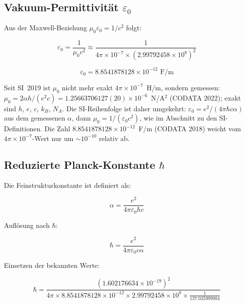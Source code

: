 	\subsection{Vakuum-Permittivität $\varepsilon_0$}
	
	Aus der Maxwell-Beziehung $\mu_0 \varepsilon_0 = 1/c^2$ folgt:
	
	\begin{equation}
		\varepsilon_0 = \frac{1}{\mu_0 c^2} \approx \frac{1}{4\pi \times 10^{-7} \times (2.99792458 \times 10^8)^2}
	\end{equation}
	
	\begin{tcolorbox}[colback=green!5!white,colframe=green!75!black,title=Vakuum-Permittivität]
		\begin{equation}
			\boxed{\varepsilon_0 = 8.8541878128 \times 10^{-12} \text{ F/m}}
		\end{equation}
	\end{tcolorbox}
	
	Seit SI~2019 ist $\mu_0$ nicht mehr exakt $4\pi\times10^{-7}$~H/m, sondern gemessen: $\mu_0 = 2\alpha h/(e^2 c) = 1.25663706127(20)\times10^{-6}$~N/A$^2$ (CODATA 2022); exakt sind $h$, $e$, $c$, $k_B$, $N_A$. Die SI-Reihenfolge ist daher umgekehrt: $\varepsilon_0 = e^2/(4\pi\hbar c\alpha)$ aus dem gemessenen $\alpha$, dann $\mu_0 = 1/(\varepsilon_0 c^2)$, wie im Abschnitt zu den SI-Definitionen. Die Zahl $8.8541878128\times10^{-12}$~F/m (CODATA 2018) weicht vom $4\pi\times10^{-7}$-Wert nur um $\sim10^{-10}$ relativ ab.
	
	\subsection{Reduzierte Planck-Konstante $\hbar$}
	
	Die Feinstrukturkonstante ist definiert als:
	
	\begin{equation}
		\alpha = \frac{e^2}{4\pi\varepsilon_0\hbar c}
	\end{equation}
	
	Auflösung nach $\hbar$:
	
	\begin{equation}
		\hbar = \frac{e^2}{4\pi\varepsilon_0 c \alpha}
	\end{equation}
	
	Einsetzen der bekannten Werte:
	
	\begin{equation}
		\hbar = \frac{(1.602176634 \times 10^{-19})^2}{4\pi \times 8.8541878128 \times 10^{-12} \times 2.99792458 \times 10^8 \times \frac{1}{137.035999084}}
	\end{equation}
	
